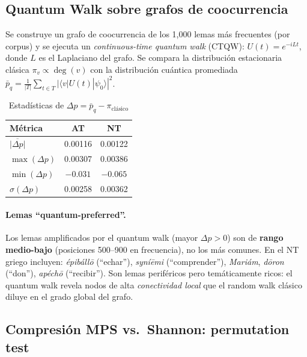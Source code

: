 \documentclass[12pt,a4paper]{article}
\newcommand{\ot}{\textcolor{otcolor}{\textbf{AT}}}
\newcommand{\nt}{\textcolor{ntcolor}{\textbf{NT}}}
\begin{document}
\subsection{Quantum Walk sobre grafos de coocurrencia}

Se construye un grafo de coocurrencia de los 1,000 lemas m\'as frecuentes (por corpus)
y se ejecuta un \emph{continuous-time quantum walk} (CTQW):
$U(t) = e^{-iLt}$, donde $L$ es el Laplaciano del grafo. Se compara la distribuci\'on
estacionaria cl\'asica $\pi_v \propto \deg(v)$ con la distribuci\'on cu\'antica promediada
$\bar{p}_q = \frac{1}{|T|} \sum_{t \in T} |\langle v|U(t)|\psi_0\rangle|^2$.

\begin{table}[H]
\centering
\caption{Estad\'isticas de $\Delta p = \bar{p}_q - \pi_{\text{cl\'asico}}$}
\label{tab:qwalk}
\begin{tabular}{lcc}
\toprule
\textbf{M\'etrica} & \textbf{\ot{}} & \textbf{\nt{}} \\
\midrule
$\overline{|\Delta p|}$  & 0.00116 & 0.00122 \\
$\max(\Delta p)$          & 0.00307 & 0.00386 \\
$\min(\Delta p)$          & $-0.031$ & $-0.065$ \\
$\sigma(\Delta p)$        & 0.00258 & 0.00362 \\
\bottomrule
\end{tabular}
\end{table}

\paragraph{Lemas ``quantum-preferred''.}
Los lemas amplificados por el quantum walk (mayor $\Delta p > 0$) son de
\textbf{rango medio-bajo} (posiciones 500--900 en frecuencia), no los m\'as comunes.
En el NT griego incluyen: \textit{\'epib\'all\=o} (``echar''), \textit{syn\'i\=emi} (``comprender''),
\textit{Mari\'am}, \textit{d\=oron} (``don''), \textit{ap\'ech\=o} (``recibir'').
Son lemas perif\'ericos pero tem\'aticamente ricos: el quantum walk revela
nodos de alta \emph{conectividad local} que el random walk cl\'asico diluye
en el grado global del grafo.

\subsection{Compresi\'on MPS vs.\ Shannon: permutation test}
\end{document}
